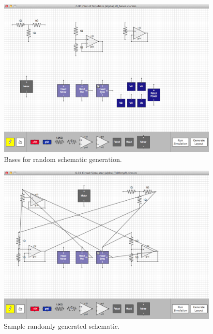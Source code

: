 \begin{figure}[H]
\begin{center}
\includegraphics[width=\textwidth]{Images/auto_generation_bases.png}
\caption{Bases for random schematic generation.}
\label{fig:random_gen_bases}
\end{center}
\end{figure}

\begin{figure}[H]
\begin{center}
\includegraphics[width=\textwidth]{Images/auto_generation_example.png}
\caption{Sample randomly generated schematic.}
\label{fig:example_random_schematic}
\end{center}
\end{figure}

